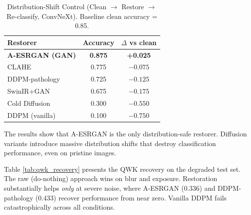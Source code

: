 \documentclass[conference]{IEEEtran}
\begin{document}
\begin{table}[htbp]
\caption{Distribution-Shift Control (Clean $\rightarrow$ Restore $\rightarrow$ Re-classify, ConvNeXt). Baseline clean accuracy = 0.85.}
\begin{center}
\begin{tabular}{lcc}
\toprule
\textbf{Restorer} & \textbf{Accuracy} & \textbf{$\Delta$ vs clean} \\
\midrule
\textbf{A-ESRGAN (GAN)} & \textbf{0.875} & \textbf{+0.025} \\
CLAHE & 0.775 & $-0.075$ \\
DDPM-pathology & 0.725 & $-0.125$ \\
SwinIR+GAN & 0.675 & $-0.175$ \\
Cold Diffusion & 0.300 & $-0.550$ \\
DDPM (vanilla) & 0.100 & $-0.750$ \\
\bottomrule
\end{tabular}
\label{tab:dist_shift}
\end{center}
\end{table}

The results show that A-ESRGAN is the only distribution-safe restorer. Diffusion variants introduce massive distribution shifts that destroy classification performance, even on pristine images.

Table \ref{tab:qwk_recovery} presents the QWK recovery on the degraded test set. The raw (do-nothing) approach wins on blur and exposure. Restoration substantially helps \textit{only} at severe noise, where A-ESRGAN (0.336) and DDPM-pathology (0.433) recover performance from near zero. Vanilla DDPM fails catastrophically across all conditions.
\end{document}
